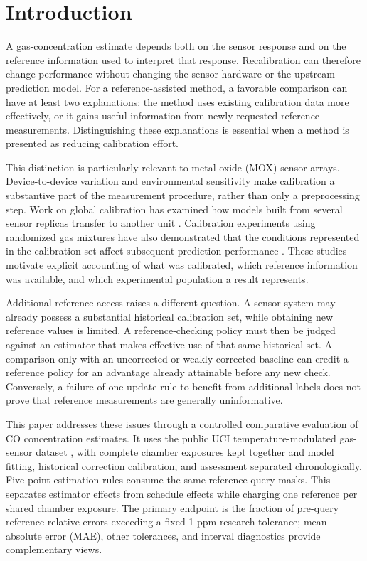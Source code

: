 \section{Introduction}
A gas-concentration estimate depends both on the sensor response and on the reference information used to interpret that response. Recalibration can therefore change performance without changing the sensor hardware or the upstream prediction model. For a reference-assisted method, a favorable comparison can have at least two explanations: the method uses existing calibration data more effectively, or it gains useful information from newly requested reference measurements. Distinguishing these explanations is essential when a method is presented as reducing calibration effort.

This distinction is particularly relevant to metal-oxide (MOX) sensor arrays. Device-to-device variation and environmental sensitivity make calibration a substantive part of the measurement procedure, rather than only a preprocessing step. Work on global calibration has examined how models built from several sensor replicas transfer to another unit \cite{miquel2022}. Calibration experiments using randomized gas mixtures have also demonstrated that the conditions represented in the calibration set affect subsequent prediction performance \cite{baur2020}. These studies motivate explicit accounting of what was calibrated, which reference information was available, and which experimental population a result represents.

Additional reference access raises a different question. A sensor system may already possess a substantial historical calibration set, while obtaining new reference values is limited. A reference-checking policy must then be judged against an estimator that makes effective use of that same historical set. A comparison only with an uncorrected or weakly corrected baseline can credit a reference policy for an advantage already attainable before any new check. Conversely, a failure of one update rule to benefit from additional labels does not prove that reference measurements are generally uninformative.

This paper addresses these issues through a controlled comparative evaluation of CO concentration estimates. It uses the public UCI temperature-modulated gas-sensor dataset \cite{uci487}, with complete chamber exposures kept together and model fitting, historical correction calibration, and assessment separated chronologically. Five point-estimation rules consume the same reference-query masks. This separates estimator effects from schedule effects while charging one reference per shared chamber exposure. The primary endpoint is the fraction of pre-query reference-relative errors exceeding a fixed 1 ppm research tolerance; mean absolute error (MAE), other tolerances, and interval diagnostics provide complementary views.

